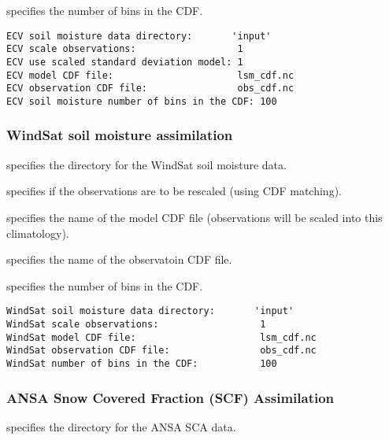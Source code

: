   specifies the
 number of bins in the CDF.
 

 \begin{Verbatim}[frame=single]
ECV soil moisture data directory:       'input'
ECV scale observations:                  1
ECV use scaled standard deviation model: 1
ECV model CDF file:                      lsm_cdf.nc
ECV observation CDF file:                obs_cdf.nc
ECV soil moisture number of bins in the CDF: 100 
 \end{Verbatim}

 
 \subsubsection{WindSat soil moisture assimilation}
 \label{sssec:windsatsmda}
 

 
  specifies the directory
 for the WindSat soil moisture data.

  specifies if the
 observations are to be rescaled (using CDF matching).

  specifies the
 name of the model CDF file (observations will be scaled into this
 climatology).

  specifies the
 name of the observatoin CDF file.

  specifies the
 number of bins in the CDF.
 

 \begin{Verbatim}[frame=single]
WindSat soil moisture data directory:       'input'
WindSat scale observations:                  1
WindSat model CDF file:                      lsm_cdf.nc
WindSat observation CDF file:                obs_cdf.nc
WindSat number of bins in the CDF:           100
 \end{Verbatim}




 
 \subsubsection{ANSA Snow Covered Fraction (SCF) Assimilation}
 \label{sssec:ansascfda}
 

 
  specifies the directory for the
 ANSA SCA data.


